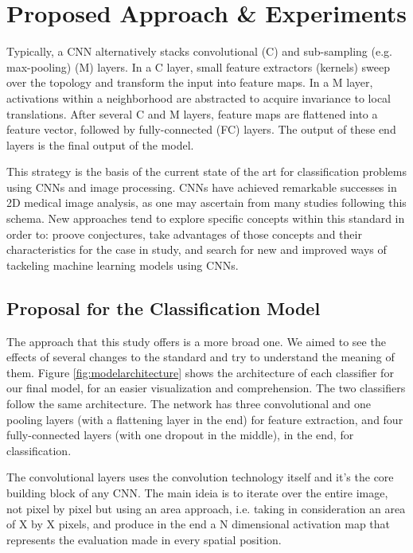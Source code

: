\documentclass[10pt]{IEEEtran}
\begin{document}
\newpage{}
\section{\textbf{Proposed Approach \& Experiments}} %
\label{pae}

Typically, a CNN alternatively stacks convolutional (C) and sub-sampling (e.g. max-pooling) (M) layers. 
In a C layer, small feature extractors (kernels) sweep over the topology and transform the input into feature maps. 
In a M layer, activations within a neighborhood are abstracted to acquire invariance to local translations. 
After several C and M layers, feature maps are flattened into a feature vector, followed by fully-connected (FC) layers. 
The output of these end layers is the final output of the model.

This strategy is the basis of the current state of the art for classification problems using CNNs and image processing.
CNNs have achieved remarkable successes in 2D medical image analysis, as one may ascertain from many studies following this schema.
New approaches tend to explore specific concepts within this standard in order to: proove conjectures, take advantages of those concepts and their characteristics for the case in study, and search for new and improved ways of tackeling machine learning models using CNNs.

\subsection{Proposal for the Classification Model}

The approach that this study offers is a more broad one. 
We aimed to see the effects of several changes to the standard and try to understand the meaning of them.
Figure \ref{fig:modelarchitecture} shows the architecture of each classifier for our final model, for an easier visualization and comprehension.
The two classifiers follow the same architecture.
The network has three convolutional and one pooling layers (with a flattening layer in the end) for feature extraction, and four fully-connected layers (with one dropout in the middle), in the end, for classification. 

The convolutional layers uses the convolution technology itself and it's the core building block of any CNN. 
The main ideia is to iterate over the entire image, not pixel by pixel but using an area approach, i.e. taking in consideration an area of X by X pixels, and produce in the end a N dimensional activation map that represents the evaluation made in every spatial position.
\end{document}
